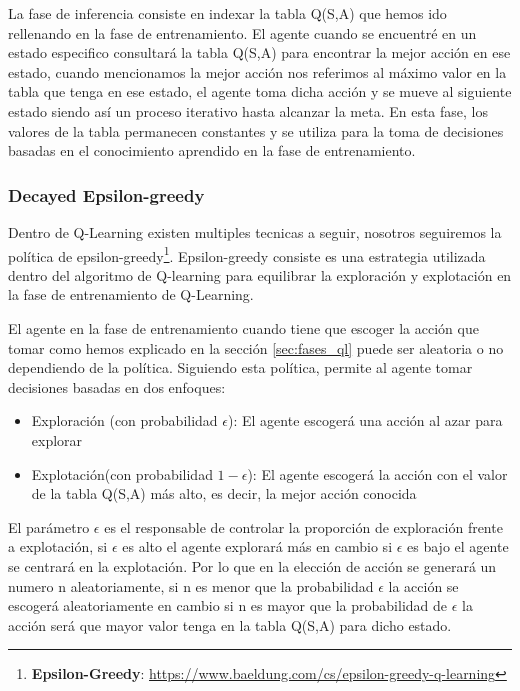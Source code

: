 La fase de inferencia consiste en indexar la tabla Q(S,A) que hemos ido rellenando en la fase de entrenamiento. El agente cuando se encuentré en un estado especifico consultará la tabla Q(S,A) para
encontrar la mejor acción en ese estado, cuando mencionamos la mejor acción nos referimos al máximo valor en la tabla que tenga en ese estado, el agente toma dicha acción y se mueve al siguiente estado
siendo así un proceso iterativo hasta alcanzar la meta. En esta fase, los valores de la tabla permanecen constantes y se utiliza para la toma de decisiones basadas en el conocimiento
aprendido en la fase de entrenamiento. 

\subsubsection{ Decayed Epsilon-greedy}
\label{sec:epsilon}
Dentro de Q-Learning existen multiples tecnicas a seguir, nosotros seguiremos la política de epsilon-greedy\footnote{\textbf{Epsilon-Greedy}: \url{https://www.baeldung.com/cs/epsilon-greedy-q-learning}}. Epsilon-greedy consiste es una estrategia utilizada dentro del algoritmo
de Q-learning para equilibrar la exploración y explotación en la fase de entrenamiento de Q-Learning. \newline

El agente en la fase de entrenamiento cuando tiene que escoger la acción que tomar como hemos explicado en la sección \ref{sec:fases_ql} puede ser aleatoria o no dependiendo de la política.
Siguiendo esta política, permite al agente tomar decisiones basadas en dos enfoques:

\begin{itemize}
  \item Exploración (con probabilidad $\epsilon$): El agente escogerá una acción al azar para explorar
  \item Explotación(con probabilidad $ 1 - \epsilon$): El agente escogerá la acción con el valor de la tabla Q(S,A) más alto, es decir, la mejor acción conocida
\end{itemize}

El parámetro $\epsilon$ es el responsable de controlar la proporción de exploración frente a explotación, si $\epsilon$  es alto el agente explorará más en cambio si $\epsilon$ es bajo
el agente se centrará en la explotación. Por lo que en la elección de acción se generará un numero n aleatoriamente, si n es menor que la probabilidad $\epsilon$ la acción se escogerá aleatoriamente
en cambio si n es mayor que la probabilidad de $\epsilon$ la acción será que mayor valor tenga en la tabla Q(S,A) para dicho estado. \newline

